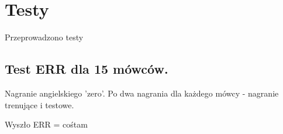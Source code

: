 \chapter{Testy}

Przeprowadzono testy 

\section{Test ERR dla 15 mówców.}

Nagranie angielskiego 'zero'. Po dwa nagrania dla każdego mówcy - nagranie trenujące i testowe.

Wyszło ERR = cośtam
